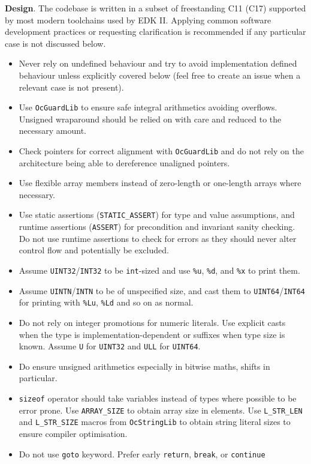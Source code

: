 \documentclass[]{article}
\providecommand{\tightlist}{%
  \setlength{\itemsep}{0pt}\setlength{\parskip}{0pt}}
\begin{document}
\textbf{Design}. The codebase is written in a subset of freestanding C11 (C17) supported by
most modern toolchains used by EDK II. Applying common software development practices or requesting
clarification is recommended if any particular case is not discussed below.
\begin{itemize}
\tightlist
\item Never rely on undefined behaviour and try to avoid implementation defined behaviour unless
explicitly covered below (feel free to create an issue when a relevant case is not present).
\item Use \texttt{OcGuardLib} to ensure safe integral arithmetics avoiding overflows. Unsigned
wraparound should be relied on with care and reduced to the necessary amount.
\item Check pointers for correct alignment with \texttt{OcGuardLib} and do not rely on the architecture
being able to dereference unaligned pointers.
\item Use flexible array members instead of zero-length or one-length arrays where necessary.
\item Use static assertions (\texttt{STATIC\_ASSERT}) for type and value assumptions, and runtime
assertions (\texttt{ASSERT}) for precondition and invariant sanity checking. Do not use runtime
assertions to check for errors as they should never alter control flow and potentially be excluded.
\item Assume \texttt{UINT32}/\texttt{INT32} to be \texttt{int}-sized and use \texttt{\%u},
\texttt{\%d}, and \texttt{\%x} to print them.
\item Assume \texttt{UINTN}/\texttt{INTN} to be of unspecified size, and cast them to
\texttt{UINT64}/\texttt{INT64} for printing with \texttt{\%Lu}, \texttt{\%Ld} and so on as normal.
\item Do not rely on integer promotions for numeric literals. Use explicit casts when the type is
implementation-dependent or suffixes when type size is known. Assume \texttt{U} for \texttt{UINT32}
and \texttt{ULL} for \texttt{UINT64}.
\item Do ensure unsigned arithmetics especially in bitwise maths, shifts in particular.
\item \texttt{sizeof} operator should take variables instead of types where possible to be error prone.
Use \texttt{ARRAY\_SIZE} to obtain array size in elements. Use \texttt{L\_STR\_LEN} and
\texttt{L\_STR\_SIZE} macros from \texttt{OcStringLib} to obtain string literal sizes to ensure compiler
optimisation.
\item Do not use \texttt{goto} keyword. Prefer early \texttt{return}, \texttt{break}, or \texttt{continue}

\end{itemize}
\end{document}
